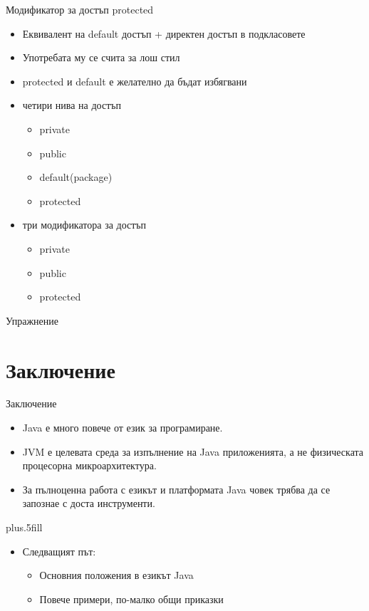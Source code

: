 \documentclass{beamer}
\begin{document}
\begin{frame}{Модификатор за достъп protected}
  \transdissolve
  \begin{itemize}
  \item Еквивалент на default достъп + директен достъп в подкласовете
  \item Употребата му се счита за лош стил
  \item protected и default е желателно да бъдат избягвани
  \item четири нива на достъп
    \begin{itemize}
      \item private
      \item public
      \item default(package)
      \item protected
    \end{itemize}
  \item три модификатора за достъп
    \begin{itemize}
      \item private
      \item public
      \item protected
    \end{itemize}
  \end{itemize}
\end{frame}

\begin{frame}{Упражнение}
  \transdissolve
  
\end{frame}

\section*{Заключение}

\begin{frame}{Заключение}
  \transdissolve
  \begin{itemize}
  \item
    Java \alert{е много повече от език за програмиране}.
  \item
    JVM \alert{е целевата среда за изпълнение} на Java приложенията, а
    не физическата процесорна микроархитектура.
  \item
    За пълноценна работа с езикът и платформата Java човек трябва да
    се запознае с доста инструменти.
  \end{itemize}
  
  \vskip0pt plus.5fill
  \begin{itemize}
  \item
    Следващият път:
    \begin{itemize}
    \item
      Основния положения в езикът Java
    \item
      Повече примери, по-малко общи приказки
    \end{itemize}
  \end{itemize}
\end{frame}
\end{document}
